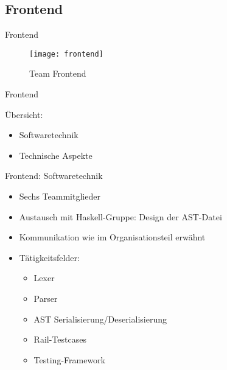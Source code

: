 \subsection{Frontend}

\begin{frame}{Frontend}

	\begin{figure}
	  \begin{center}
	    \leavevmode
	      \texttt{[image: frontend]}
	    \caption{Team Frontend}
	  \end{center}
	\end{figure}

\end{frame}

\begin{frame}{Frontend}

	\pause
	\"Ubersicht:
	\pause
	\begin{itemize}
		\item Softwaretechnik
		\pause
		\item Technische Aspekte
		\pause
	\end{itemize}

\end{frame}

\pagepreak


\begin{frame}{Frontend: Softwaretechnik}
	
	\pause
	\begin{itemize}
		\item Sechs Teammitglieder
		\pause
		\item Austausch mit Haskell-Gruppe: Design der AST-Datei
		\pause
		\item Kommunikation wie im Organisationsteil erw\"ahnt
		\pause
		\item T\"atigkeitsfelder:
		\pause
		\begin{itemize}
			\item Lexer
			\pause
			\item Parser
			\pause
			\item AST Serialisierung/Deserialisierung
			\pause
			\item Rail-Testcases
			\pause
			\item Testing-Framework
		\end{itemize}
	\end{itemize}
	
\end{frame}

